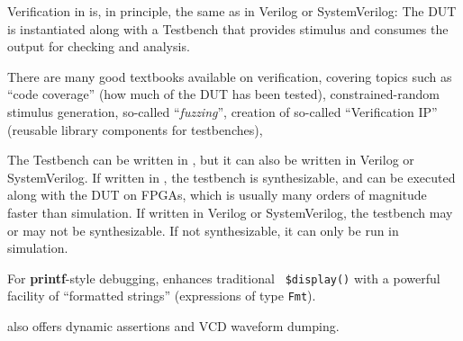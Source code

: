 Verification in {\BSV} is, in principle, the same as in Verilog or
SystemVerilog: The DUT is instantiated along with a Testbench that
provides stimulus and consumes the output for checking and analysis.

There are many good textbooks available on verification, covering
topics such as ``code coverage'' (how much of the DUT has been
tested), constrained-random stimulus generation, so-called
``\emph{fuzzing}'', creation of so-called ``Verification IP''
(reusable library components for testbenches), {\etc}

The Testbench can be written in {\BSV}, but it can also be written in
Verilog or SystemVerilog.  If written in {\BSV}, the testbench is
synthesizable, and can be executed along with the DUT on FPGAs, which
is usually many orders of magnitude faster than simulation.  If
written in Verilog or SystemVerilog, the testbench may or may not be
synthesizable.  If not synthesizable, it can only be run in
simulation.


For {\bf printf}-style debugging, {\BSV} enhances traditional {\tt
\$display()} with a powerful facility of ``formatted strings''
(expressions of type {\tt Fmt}).

{\BSV} also offers dynamic assertions and VCD waveform dumping.

